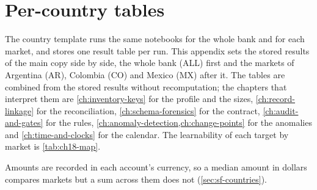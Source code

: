 \chapter{Per-country tables}\label{app:per-country}

The country template runs the same notebooks for the whole bank and for each market, and stores one result table per
run. This appendix sets the stored results of the main copy side by side, the whole bank (ALL) first and the markets of
Argentina (AR), Colombia (CO) and Mexico (MX) after it. The tables are combined from the stored results without
recomputation; the chapters that interpret them are \cref{ch:inventory-keys} for the profile and the sizes,
\cref{ch:record-linkage} for the reconciliation, \cref{ch:schema-forensics} for the contract,
\cref{ch:audit-and-gates} for the rules, \cref{ch:anomaly-detection,ch:change-points} for the anomalies and
\cref{ch:time-and-clocks} for the calendar. The learnability of each target by market is \cref{tab:ch18-map}.

Amounts are recorded in each account's currency, so a median amount in dollars compares markets but a sum across them
does not (\cref{sec:sf-countries}).









